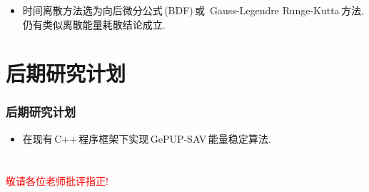 \documentclass{beamer}
\begin{document}
\begin{CJK*}{UTF8}{gkai}
\begin{frame}
    \begin{itemize}
    \item 时间离散方法选为向后微分公式\,(BDF)\,或\,
      Gauss-Legendre Runge-Kutta\,方法,
      仍有类似离散能量耗散结论成立.
    \end{itemize}
  \end{frame}
  \section{后期研究计划}
  \begin{frame}
    \frametitle{后期研究计划}


    \begin{itemize}
    \item
      在现有\,C++\,程序框架下实现\,GePUP-SAV\,能量稳定算法.
    \end{itemize}
  \end{frame}

  \section*{}
  \begin{frame}
    \centering\huge
    \textcolor{red}{敬请各位老师批评指正!}
  \end{frame}

\end{CJK*}
\end{document}
